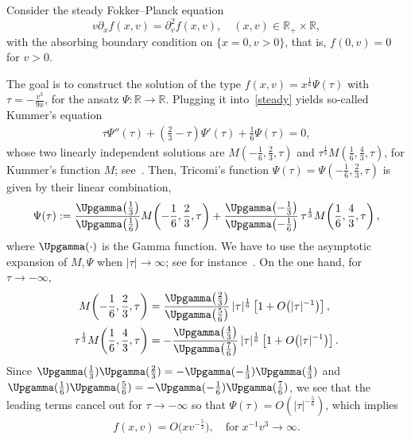 \documentclass[AHL,Unicode,longabstracts,published]{cedram}
\newcommand*\p{\partial}
\newcommand*\R {\mathbb{R}}
\begin{document}
Consider the steady Fokker--Planck equation
\begin{equation}\label{steady}
v\p_xf(x,v)=\p_v^2f(x,v),\quad (x,v)\in\R_+\times\R,
\end{equation}
with the absorbing boundary condition on $\{x=0,v>0\}$, that is, $f(0,v)=0$ for $v>0$.

The goal is to construct the solution of the type $f(x,v)=x^\frac{1}{6}\Psi(\tau)$ with $\tau=-\frac{v^3}{9x}$, for the ansatz $\Psi:\R\rightarrow\R$. Plugging it into~\eqref{steady} yields so-called Kummer's equation
\begin{align*}
\tau\Psi''(\tau)+\left(\frac{2}{3}-\tau\right)\Psi'(\tau)+\frac{1}{6}\Psi(\tau)=0,
\end{align*}
whose two linearly independent solutions are $M(-\frac{1}{6},\frac{2}{3},\tau)$ and $\tau^\frac{1}{3} M(\frac{1}{6},\frac{4}{3},\tau)$, for Kummer's function $M$; see~\cite[Chapter~6]{Wangzhuxi}. Then, Tricomi's function $\Psi(\tau)=\Psi(-\frac{1}{6},\frac{2}{3},\tau)$ is given by their linear combination,
\begin{equation}\label{Tricomi}
\Psi(\tau):=\frac{\Upgamma\!\left(\frac{1}{3}\right)}{\Upgamma\!\left(\frac{1}{6}\right)} M\!\left(-\frac{1}{6},\frac{2}{3},\tau\right) + \frac{\Upgamma\!\left(-\frac{1}{3}\right)}{\Upgamma\!\left(-\frac{1}{6}\right)}\, \tau^\frac{1}{3} M\!\left(\frac{1}{6},\frac{4}{3},\tau\right),
\end{equation}
where $\Upgamma(\cdot)$ is the Gamma function. We have to use the asymptotic expansion of $M,\Psi$ when $|\tau|\rightarrow\infty$; see for instance~\cite[Section~6.6]{Wangzhuxi}. On the one hand, for $\tau\rightarrow-\infty$,
\begin{align*}
M\!\left(-\frac{1}{6},\frac{2}{3},\tau\right) &= \frac{\Upgamma\!\left(\frac{2}{3}\right)}{\Upgamma\!\left(\frac{5}{6}\right)}
\,|\tau|^\frac{1}{6} \left[1+O\!\left(|\tau|^{-1}\right)\right], \\
\tau^\frac{1}{3} M\!\left(\frac{1}{6},\frac{4}{3},\tau\right) &=- \frac{\Upgamma\!\left(\frac{4}{3}\right)}{\Upgamma\!\left(\frac{7}{6}\right)}
\,|\tau|^{\frac{1}{6}} \left[1+O\!\left(|\tau|^{-1}\right)\right].
\end{align*}
Since $\Upgamma(\frac{1}{3})\Upgamma(\frac{2}{3})=-\Upgamma(-\frac{1}{3})\Upgamma(\frac{4}{3})$ and $\Upgamma(\frac{1}{6})\Upgamma(\frac{5}{6})=-\Upgamma(-\frac{1}{6})\Upgamma(\frac{7}{6})$, we see that the leading terms cancel out for $\tau\rightarrow-\infty$ so that $\Psi(\tau)=O(|\tau|^{-\frac{5}{6}})$, which implies
\begin{align*}
f(x,v)=O\big(xv^{-\frac{5}{2}}\big),\quad\text{for}\; x^{-1}{v^3}\rightarrow\infty.
\end{align*}
\end{document}
